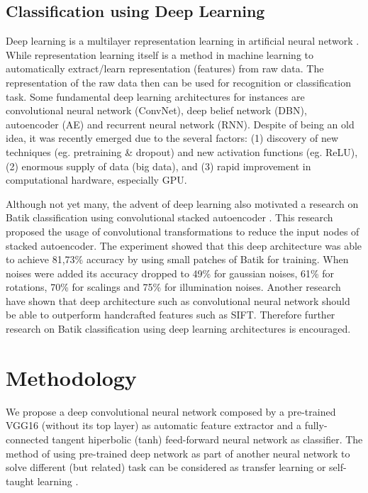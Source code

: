 \documentclass[conference, compsoc]{IEEEtran}
\begin{document}
\subsection{Classification using Deep Learning}

Deep learning is a multilayer representation learning in artificial neural network \cite{lecun2015deep}. While representation learning itself is a method in machine learning to automatically extract/learn representation (features) from raw data. The representation of the raw data then can be used for recognition or classification task. Some fundamental deep learning architectures for instances are convolutional neural network (ConvNet), deep belief network (DBN), autoencoder (AE) and recurrent neural network (RNN). Despite of being an old idea, it was recently emerged due to the several factors: (1) discovery of new techniques (eg. pretraining \& dropout) and new activation functions (eg. ReLU), (2) enormous supply of data (big data), and (3) rapid improvement in computational hardware, especially GPU.

Although not yet many, the advent of deep learning also motivated a research on Batik classification using convolutional stacked autoencoder \cite{menzata2014sistem}. This research proposed the usage of convolutional transformations to reduce the input nodes of stacked autoencoder. The experiment showed that this deep architecture was able to achieve 81,73\% accuracy by using small patches of Batik for training. When noises were added its accuracy dropped to 49\% for gaussian noises, 61\% for rotations, 70\% for scalings and 75\% for illumination noises. Another research have shown that deep architecture such as convolutional neural network should be able to outperform handcrafted features such as SIFT\cite{fischer2014descriptor}. Therefore further research on Batik classification using deep learning architectures is encouraged.

\section{Methodology}

We propose a deep convolutional neural network composed by a pre-trained VGG16 (without its top layer) as automatic feature extractor and a fully-connected tangent hiperbolic (tanh) feed-forward neural network as classifier. The method of using pre-trained deep network as part of another neural network to solve different (but related) task can be considered as transfer learning or self-taught learning \cite{raina2007self}.
\end{document}
